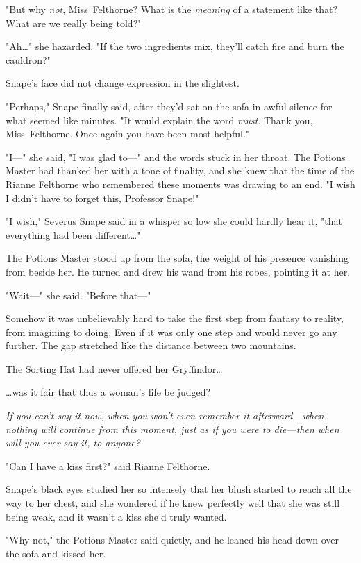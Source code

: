 "But why \emph{not}, Miss~Felthorne? What is the \emph{meaning} of a statement
like that? What are we really being told?"

"Ah{\ldots}" she hazarded. "If the two ingredients mix, they'll catch fire and
burn the cauldron?"

Snape's face did not change expression in the slightest.

"Perhaps," Snape finally said, after they'd sat on the sofa in awful silence
for what seemed like minutes. "It would explain the word \emph{must}. Thank
you, Miss~Felthorne. Once again you have been most helpful."

"I---" she said, "I was glad to---" and the words stuck in her throat. The
Potions Master had thanked her with a tone of finality, and she knew that the
time of the Rianne Felthorne who remembered these moments was drawing to an
end. "I wish I didn't have to forget this, Professor Snape!"

"I wish," Severus Snape said in a whisper so low she could hardly hear it,
"that everything had been different{\ldots}"

The Potions Master stood up from the sofa, the weight of his presence vanishing
from beside her. He turned and drew his wand from his robes, pointing it at her.

"Wait---" she said. "Before that---"

Somehow it was unbelievably hard to take the first step from fantasy to
reality, from imagining to doing. Even if it was only one step and would never
go any further. The gap stretched like the distance between two mountains.

The Sorting Hat had never offered her Gryffindor{\ldots}

{\ldots}was it fair that thus a woman's life be judged?

\emph{If you can't say it now, when you won't even remember it afterward---when
nothing will continue from this moment, just as if you were to die---then when
will you ever say it, to anyone?}

"Can I have a kiss first?" said Rianne Felthorne.

Snape's black eyes studied her so intensely that her blush started to reach all
the way to her chest, and she wondered if he knew perfectly well that she was
still being weak, and it wasn't a kiss she'd truly wanted.

"Why not," the Potions Master said quietly, and he leaned his head down over
the sofa and kissed her.

